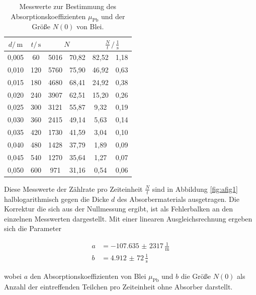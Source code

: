 \FloatBarrier
\begin{table}[h]
    \centering
    \caption{Messwerte zur Bestimmung des Absorptionskoeffizienten $\mu_\text{Pb}$ und der Größe $N\left(0\right)$ von Blei.}
    \label{tab:atab2}
    \begin{tabular}{S[table-format=1.3] S[table-format=3.0] S[table-format=4.0] @{${}\pm{}$} S[table-format=2.2] S[table-format=2.2] @{${}\pm{}$} S[table-format=1.2]}
        \toprule
        {$d / \, \si{\meter}$} & {$t / \, \si{\second}$} &  &  \\
        ,005 & 60  & 5016 & 70,82 & 82,52 & 1,18 \\
        0,010 & 120 & 5760 & 75,90 & 46,92 & 0,63 \\
        0,015 & 180 & 4680 & 68,41 & 24,92 & 0,38 \\
        0,020 & 240 & 3907 & 62,51 & 15,20 & 0,26 \\
        0,025 & 300 & 3121 & 55,87 & 9,32  & 0,19 \\
        0,030 & 360 & 2415 & 49,14 & 5,63  & 0,14 \\
        0,035 & 420 & 1730 & 41,59 & 3,04  & 0,10 \\
        0,040 & 480 & 1428 & 37,79 & 1,89  & 0,09 \\
        0,045 & 540 & 1270 & 35,64 & 1,27  & 0,07 \\
        0,050 & 600 & 971  & 31,16 & 0,54  & 0,06 \\
        \bottomrule
    \end{tabular}
\end{table}
\FloatBarrier
\noindent

Diese Messwerte der Zählrate pro Zeiteinheit $\frac{N}{t}$ sind in Abbildung \ref{fig:afig1} halblogarithmisch gegen 
die Dicke $d$ des Absorbermaterials ausgetragen. Die Korrektur die sich aus der Nullmessung ergibt, ist als Fehlerbalken
an den einzelnen Messwerten dargestellt. Mit einer linearen Ausgleichsrechnung ergeben sich die Parameter

\begin{align*}
    a &= \num{-107,635(2317)} \, \frac{1}{\si{\meter}} \\
    b &= \num{4,912(72)}      \, \frac{1}{\si{\second}} \,
\end{align*}

wobei $a$ den Absorptionskoeffizienten von Blei $\mu_\text{Pb}$ und $b$ die Größe $N\left(0\right)$ als Anzahl der eintreffenden
Teilchen pro Zeiteinheit ohne Absorber darstellt. 

